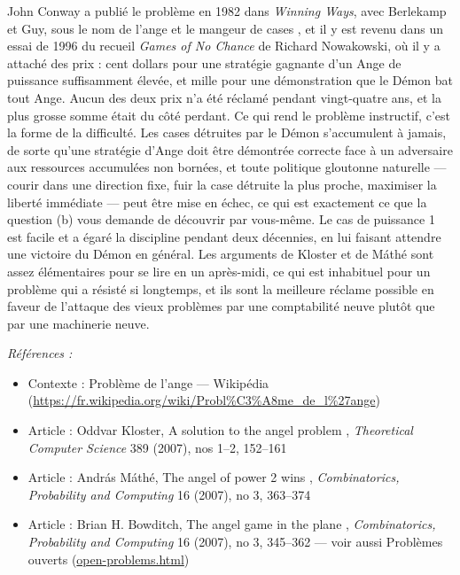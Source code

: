 \documentclass[11pt]{article}
\newenvironment{refs}{\par\small\noindent\emph{Références :}\begin{itemize}\setlength\itemsep{0pt}}{\end{itemize}\normalsize}
\begin{document}
\noindent John Conway a publié le problème en 1982 dans \textit{Winning Ways}, avec
Berlekamp et Guy, sous le nom de \og{} l'ange et le mangeur de cases \fg{}, et il y est revenu dans un
essai de 1996 du recueil \textit{Games of No Chance} de Richard Nowakowski, où il y a attaché des
prix : cent dollars pour une stratégie gagnante d'un Ange de puissance suffisamment élevée, et
mille pour une démonstration que le Démon bat tout Ange. Aucun des deux prix n'a été réclamé
pendant vingt-quatre ans, et la plus grosse somme était du côté perdant. Ce qui rend le
problème instructif, c'est la forme de la difficulté. Les cases détruites par le Démon
s'accumulent à jamais, de sorte qu'une stratégie d'Ange doit être démontrée correcte face à un
adversaire aux ressources accumulées non bornées, et toute politique gloutonne naturelle ---
courir dans une direction fixe, fuir la case détruite la plus proche, maximiser la liberté
immédiate --- peut être mise en échec, ce qui est exactement ce que la question (b) vous demande
de découvrir par vous-même. Le cas de puissance 1 est facile et a égaré la discipline pendant
deux décennies, en lui faisant attendre une victoire du Démon en général. Les arguments de
Kloster et de Máthé sont assez élémentaires pour se lire en un après-midi, ce qui est inhabituel
pour un problème qui a résisté si longtemps, et ils sont la meilleure réclame possible en
faveur de l'attaque des vieux problèmes par une comptabilité neuve plutôt que par une
machinerie neuve.

\begin{refs}
\item Contexte : Problème de l'ange --- Wikipédia (\url{https://fr.wikipedia.org/wiki/Probl%C3%A8me_de_l%27ange})
\item Article : Oddvar Kloster, \og{} A solution to the angel problem \fg{}, \textit{Theoretical Computer Science} 389 (2007), nos 1--2, 152--161
\item Article : András Máthé, \og{} The angel of power 2 wins \fg{}, \textit{Combinatorics, Probability and Computing} 16 (2007), no 3, 363--374
\item Article : Brian H. Bowditch, \og{} The angel game in the plane \fg{}, \textit{Combinatorics, Probability and Computing} 16 (2007), no 3, 345--362 --- voir aussi Problèmes ouverts (\url{open-problems.html})
\end{refs}

\bigskip
\end{document}
